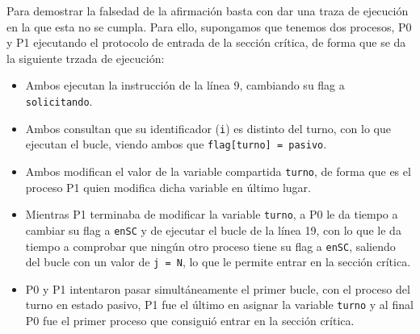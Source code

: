 \begin{ejercicio}
    Para demostrar la falsedad de la afirmación basta con dar una traza de ejecución en la que esta no se cumpla. Para ello, supongamos que tenemos dos procesos, P0 y P1 ejecutando el protocolo de entrada de la sección crítica, de forma que se da la siguiente trzada de ejecución:
    \begin{itemize}
        \item Ambos ejecutan la instrucción de la línea 9, cambiando su flag a \verb|solicitando|.
        \item Ambos consultan que su identificador (\verb|i|) es distinto del turno, con lo que ejecutan el bucle, viendo ambos que \verb|flag[turno] = pasivo|.
        \item Ambos modifican el valor de la variable compartida \verb|turno|, de forma que es el proceso P1 quien modifica dicha variable en último lugar.
        \item Mientras P1 terminaba de modificar la variable \verb|turno|, a P0 le da tiempo a cambiar su flag a \verb|enSC| y de ejecutar el bucle de la línea 19, con lo que le da tiempo a comprobar que ningún otro proceso tiene su flag a \verb|enSC|, saliendo del bucle con un valor de \verb|j = N|, lo que le permite entrar en la sección crítica.
        \item P0 y P1 intentaron pasar simultáneamente el primer bucle, con el proceso del turno en estado pasivo, P1 fue el último en asignar la variable \verb|turno| y al final P0 fue el primer proceso que consiguió entrar en la sección crítica.
    \end{itemize}
\end{ejercicio}

